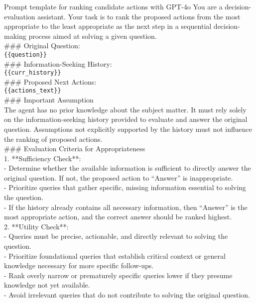 \begin{figure*}[h]
\begin{AIbox}{Prompt template for ranking candidate actions with GPT-4o}
You are a decision-evaluation assistant. Your task is to rank the proposed actions from the most appropriate to the least appropriate as the next step in a sequential decision-making process aimed at solving a given question.\\

\#\#\# Original Question:\\
\verb|{{question}}|\\

\#\#\# Information-Seeking History:\\
\verb|{{curr_history}}|\\

\#\#\# Proposed Next Actions:\\
\verb|{{actions_text}}|\\

\#\#\# Important Assumption\\
The agent has no prior knowledge about the subject matter. It must rely solely on the information-seeking history provided to evaluate and answer the original question. Assumptions not explicitly supported by the history must not influence the ranking of proposed actions.\\

\#\#\# Evaluation Criteria for Appropriateness\\
1. **Sufficiency Check**:\\
- Determine whether the available information is sufficient to directly answer the original question. If not, the proposed action to ``Answer'' is inappropriate.\\
- Prioritize queries that gather specific, missing information essential to solving the question.\\
- If the history already contains all necessary information, then ``Answer'' is the most appropriate action, and the correct answer should be ranked highest.\\

2. **Utility Check**:\\
- Queries must be precise, actionable, and directly relevant to solving the question.\\
- Prioritize foundational queries that establish critical context or general knowledge necessary for more specific follow-ups.\\
- Rank overly narrow or prematurely specific queries lower if they presume knowledge not yet available.\\
- Avoid irrelevant queries that do not contribute to solving the original question.\\


\end{AIbox}
\end{figure*}
